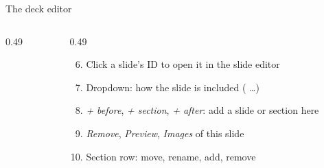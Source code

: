 \begin{standardframe}{The deck editor}
\begin{columns}[T,onlytextwidth]
\begin{column}{0.49\linewidth}
\begin{enumerate}
			\end{enumerate}
		\end{column}
		\begin{column}{0.49\linewidth}
			\scriptsize
			\begin{enumerate}
				\setcounter{enumi}{5}
				\item Click a slide's ID to open it in the slide editor
				\item Dropdown: how the slide is included ( \ldots)
				\item \emph{+ before}, \emph{+ section}, \emph{+ after}: add a slide or section here
				\item \emph{Remove}, \emph{Preview}, \emph{Images} of this slide
				\item Section row: move, rename, add, remove
			\end{enumerate}
		\end{column}
	\end{columns}
\end{standardframe}
